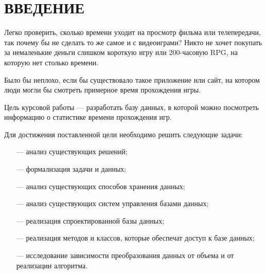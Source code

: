 \chapter*{ВВЕДЕНИЕ}

Легко проверить, сколько времени уходит на просмотр фильма или телепередачи, так почему бы не сделать то же самое и с видеоиграми? Никто не хочет покупать за немаленькие деньги слишком короткую игру или 200-часовую RPG, на которую нет столько времени. 

Было бы неплохо, если бы существовало такое приложение или сайт, на котором люди могли бы смотреть примерное время прохождения игры. 

Цель курсовой работы --- разработать базу данных, в которой можно посмотреть информацию о статистике времени прохождения игр. 

Для достижения поставленной цели необходимо решить следующие задачи:

\begin{itemize}
	\item[---] анализ существующих решений;
	\item[---] формализация задачи и данных;
	\item[---] анализ существующих способов хранения данных;
	\item[---] анализ существующих систем управления базами данных;
	\item[---] реализация спроектированной базы данных;
    \item[---] реализация методов и классов, которые обеспечат доступ к базе данных;
    \item[---] исследование зависимости преобразования данных от объема и от реализации алгоритма.
\end{itemize}

